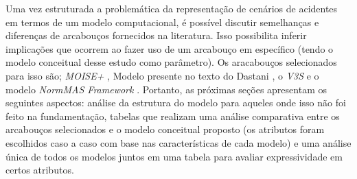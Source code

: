 Uma vez estruturada a problemática da representação de cenários de acidentes em termos de um modelo computacional, é possível discutir semelhanças e diferenças de arcabouços fornecidos na literatura. Isso possibilita inferir implicações que ocorrem ao fazer uso de um arcabouço em específico (tendo o modelo conceitual desse estudo como parâmetro). Os aracabouços selecionados para isso são; \textit{MOISE+} \cite{moiseframework}, Modelo presente no texto do Dastani \cite{dastaniframework}, o \textit{V3S} \cite{v3sframework} e o modelo \textit{NormMAS Framework} \cite{normas}. Portanto, as próximas seções apresentam os seguintes aspectos: análise da estrutura do modelo para aqueles onde isso não foi feito na fundamentação, tabelas que realizam uma análise comparativa entre os arcabouços selecionados e o modelo conceitual proposto (os atributos foram escolhidos caso a caso com base nas características de cada modelo) e uma análise única de todos os modelos juntos em uma tabela para avaliar expressividade em certos atributos.